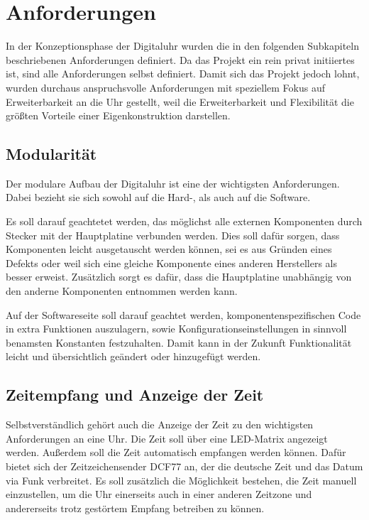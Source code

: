 \section{Anforderungen}
In der Konzeptionsphase der Digitaluhr wurden die in den folgenden Subkapiteln beschriebenen Anforderungen definiert.
Da das Projekt ein rein privat initiiertes ist, sind alle Anforderungen selbst definiert. Damit sich das Projekt jedoch
lohnt, wurden durchaus anspruchsvolle Anforderungen mit speziellem Fokus auf Erweiterbarkeit an die Uhr gestellt, weil die
Erweiterbarkeit und Flexibilität die größten Vorteile einer Eigenkonstruktion darstellen.
%
\subsection{Modularität}
Der modulare Aufbau der Digitaluhr ist eine der wichtigsten Anforderungen. Dabei bezieht sie sich sowohl auf die Hard-,
als auch auf die Software.

Es soll darauf geachtetet werden, das möglichst alle externen Komponenten durch Stecker mit der Hauptplatine verbunden werden. 
Dies soll dafür sorgen, dass Komponenten leicht ausgetauscht werden können, sei es aus Gründen eines Defekts oder weil sich eine 
gleiche Komponente eines anderen Herstellers als besser erweist. Zusätzlich sorgt es dafür, dass die Hauptplatine unabhängig
von den anderne Komponenten entnommen werden kann.

Auf der Softwareseite soll darauf geachtet werden, komponentenspezifischen Code in extra Funktionen auszulagern, sowie
Konfigurationseinstellungen in sinnvoll benamsten Konstanten festzuhalten. Damit kann in der Zukunft Funktionalität leicht und
übersichtlich geändert oder hinzugefügt werden.
%
\subsection{Zeitempfang und Anzeige der Zeit}
Selbstverständlich gehört auch die Anzeige der Zeit zu den wichtigsten Anforderungen an eine Uhr. Die Zeit soll über eine
LED-Matrix angezeigt werden. Außerdem soll die Zeit automatisch empfangen werden können. Dafür bietet sich der 
Zeitzeichensender DCF77 an, der die deutsche Zeit und das Datum via Funk verbreitet. Es soll zusätzlich die Möglichkeit
bestehen, die Zeit manuell einzustellen, um die Uhr einerseits auch in einer anderen Zeitzone und
andererseits trotz gestörtem Empfang betreiben zu können.

